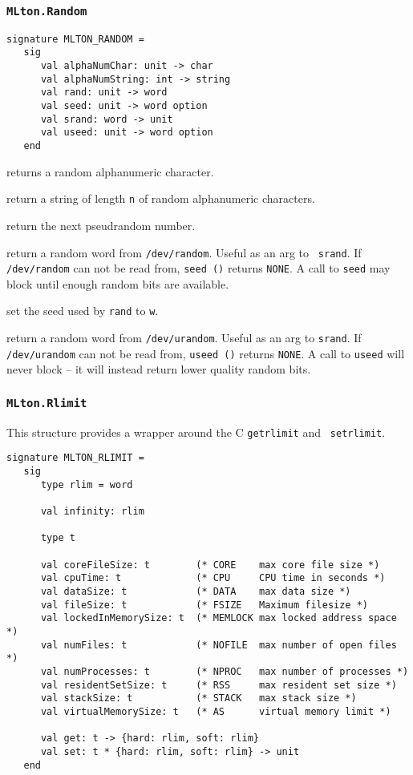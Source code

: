 \subsubsection{\tt MLton.Random}

\begin{verbatim}
signature MLTON_RANDOM =
   sig
      val alphaNumChar: unit -> char
      val alphaNumString: int -> string
      val rand: unit -> word
      val seed: unit -> word option
      val srand: word -> unit
      val useed: unit -> word option
   end
\end{verbatim}

\begin{description}
returns a random alphanumeric character.

return a string of length {\tt n} of random alphanumeric characters.

return the next pseudrandom number.

return a random word from {\tt /dev/random}.  Useful as an arg to {\tt
srand}.  If {\tt /dev/random} can not be read from, {\tt seed ()}
returns {\tt NONE}.  A call to {\tt seed} may block until enough
random bits are available.

set the seed used by {\tt rand} to {\tt w}.

return a random word from {\tt /dev/urandom}.  Useful as an arg to
{\tt srand}.  If {\tt /dev/urandom} can not be read from, {\tt useed
()} returns {\tt NONE}.  A call to {\tt useed} will never block -- it
will instead return lower quality random bits.

\end{description}
%
\subsubsection{\tt MLton.Rlimit}

This structure provides a wrapper around the C {\tt getrlimit} and {\tt
setrlimit}.
\begin{verbatim}
signature MLTON_RLIMIT =
   sig
      type rlim = word
               
      val infinity: rlim

      type t
               
      val coreFileSize: t        (* CORE    max core file size *)
      val cpuTime: t             (* CPU     CPU time in seconds *)
      val dataSize: t            (* DATA    max data size *)
      val fileSize: t            (* FSIZE   Maximum filesize *)
      val lockedInMemorySize: t  (* MEMLOCK max locked address space *)
      val numFiles: t            (* NOFILE  max number of open files *)  
      val numProcesses: t        (* NPROC   max number of processes *)
      val residentSetSize: t     (* RSS     max resident set size *)
      val stackSize: t           (* STACK   max stack size *)
      val virtualMemorySize: t   (* AS      virtual memory limit *)
      
      val get: t -> {hard: rlim, soft: rlim}
      val set: t * {hard: rlim, soft: rlim} -> unit
   end
\end{verbatim}

